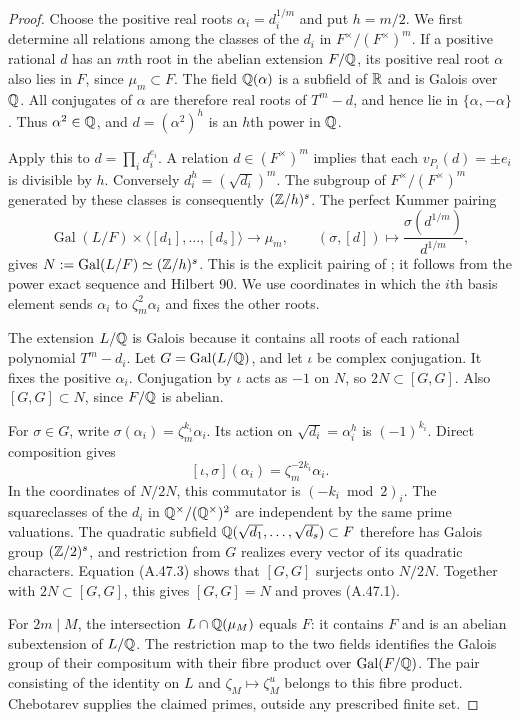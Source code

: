 \begin{proof}
Choose the positive real roots $\alpha_i=d_i^{1/m}$ and
put $h=m/2$. We first determine all relations among the
classes of the $d_i$ in $F^\times/(F^\times)^m$.
If a positive rational $d$ has an $m$th root in the
abelian extension $F/\mathbb Q$, its positive real root
$\alpha$ also lies in $F$, since $\mu_m\subset F$.
The field $\mathbb Q(\alpha)$ is a subfield of $\mathbb R$ and is
Galois over $\mathbb Q$. All conjugates of $\alpha$ are
therefore real roots of $T^m-d$, and hence lie in
$\{\alpha,-\alpha\}$. Thus $\alpha^2\in\mathbb Q$, and
$d=(\alpha^2)^h$ is an $h$th power in $\mathbb Q$.

Apply this to $d=\prod_i d_i^{e_i}$. A relation
$d\in(F^\times)^m$ implies that each
$v_{P_i}(d)=\pm e_i$ is divisible by $h$.
Conversely $d_i^h=(\sqrt{d_i})^m$. The subgroup of
$F^\times/(F^\times)^m$ generated by these classes
is consequently $(\mathbb Z/h)^s$. The perfect Kummer
pairing
\[
 \operatorname{Gal}(L/F)\times
 \langle[d_1],\ldots,[d_s]\rangle
 \longrightarrow\mu_m,\qquad
 (\sigma,[d])\longmapsto
             \frac{\sigma(d^{1/m})}{d^{1/m}},
 \tag{A.47.2}
\]
gives $N:=\operatorname{Gal}(L/F)\simeq(\mathbb Z/h)^s$.
This is the explicit pairing of
\cite[Theorem 5.30 and Remark 5.32]{AgentMilneFT};
it follows from the power exact sequence and Hilbert 90.
We use coordinates in which the $i$th basis element
sends $\alpha_i$ to $\zeta_m^2\alpha_i$ and fixes
the other roots.

The extension $L/\mathbb Q$ is Galois because it contains all
roots of each rational polynomial $T^m-d_i$. Let
$G=\operatorname{Gal}(L/\mathbb Q)$, and let $\iota$ be
complex conjugation. It fixes the positive $\alpha_i$.
Conjugation by $\iota$ acts as $-1$ on $N$, so
$2N\subset[G,G]$. Also $[G,G]\subset N$, since
$F/\mathbb Q$ is abelian.

For $\sigma\in G$, write
$\sigma(\alpha_i)=\zeta_m^{k_i}\alpha_i$.
Its action on $\sqrt{d_i}=\alpha_i^h$ is
$(-1)^{k_i}$. Direct composition gives
\[
 [\iota,\sigma](\alpha_i)
                 =\zeta_m^{-2k_i}\alpha_i.
 \tag{A.47.3}
\]
In the coordinates of $N/2N$, this commutator is
$(-k_i\bmod2)_i$. The squareclasses of the $d_i$
in $\mathbb Q^\times/(\mathbb Q^\times)^2$ are independent by
the same prime valuations. The quadratic subfield
$\mathbb Q(\sqrt{d_1},\ldots,\sqrt{d_s})\subset F$ therefore
has Galois group $(\mathbb Z/2)^s$, and restriction from
$G$ realizes every vector of its quadratic
characters. Equation (A.47.3) shows that
$[G,G]$ surjects onto $N/2N$. Together with
$2N\subset[G,G]$, this gives $[G,G]=N$ and proves
(A.47.1).

For $2m\mid M$, the intersection
$L\cap\mathbb Q(\mu_M)$ equals $F$: it contains $F$
and is an abelian subextension of $L/\mathbb Q$.
The restriction map to the two fields identifies
the Galois group of their compositum with their
fibre product over $\operatorname{Gal}(F/\mathbb Q)$.
The pair consisting of the identity on $L$ and
$\zeta_M\mapsto\zeta_M^u$ belongs to this fibre
product. Chebotarev
\cite[Theorem 8.31]{AgentMilneANT} supplies the
claimed primes, outside any prescribed finite set.
\end{proof}

